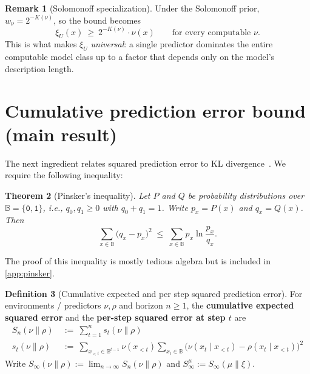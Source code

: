 \documentclass[fontsize=11pt, parskip=half]{scrartcl}
\newtheorem{theorem}{Theorem}[section]
\theoremstyle{definition}
\newtheorem{definition}[theorem]{Definition}
\newtheorem{remark}[theorem]{Remark}
\newcommand{\Sn}[2]{S_{n}(#1 \parallel #2)}
\begin{document}
\begin{remark}[Solomonoff specialization]
Under the Solomonoff prior, $w_\nu = 2^{-K(\nu)}$, so the bound becomes
\[
  \xi_U(x) ~\geq~ 2^{-K(\nu)} \cdot \nu(x) \qquad \text{for every computable }\nu.
\]
This is what makes $\xi_U$ \emph{universal}: a single predictor dominates the
entire computable model class up to a factor that depends only on the model's
description length.
\end{remark}

\section{Cumulative prediction error bound (main result)}\label{prob:bound}


The next ingredient relates squared prediction error to KL divergence~\cite[Lemma~11.6.1]{Cover:06}. 
We require the following inequality:

\begin{theorem}[Pinsker's inequality]\label{thm:pinsker}
Let $P$ and $Q$ be probability distributions over $\mathbb{B} = \{\texttt{0}, \texttt{1}\}$, i.e., $q_0, q_1 \geq 0$
with $q_0 + q_1 = 1$. Write $p_x = P(x)$ and $q_x = Q(x)$. Then
\[
    \sum_{x \in \mathbb{B}} \big( q_x - p_x \big)^2 \;\leq\; \sum_{x \in \mathbb{B}} p_x \ln \frac{p_x}{q_x}.
    \tag{$\star$}
\]

\end{theorem}
The proof of this inequality is mostly tedious algebra but is included in \cref{app:pinsker}. 


\begin{definition}[Cumulative expected and per step squared prediction error]\label{def:S_infty}
For environments / predictors $\nu, \rho$ and horizon $n \geq 1$, the \textbf{cumulative expected squared error} and the \textbf{per-step squared error at step $t$} are
\begin{align*}
\Sn{\nu}{\rho} ~&:=~ \sum_{t=1}^n s_t(\nu \parallel \rho) \\
s_t(\nu \parallel \rho) ~&:=~ \sum_{x_{<t} \in \mathbb{B}^{t-1}} \nu(x_{<t}) \sum_{x_t \in \mathbb{B}} \bigl(\nu(x_t \mid x_{<t}) - \rho(x_t \mid x_{<t})\bigr)^2
\end{align*}
Write $S_{\infty}(\nu \parallel \rho) := \lim_{n \to \infty} \Sn{\nu}{\rho}$
and $S_\infty^\mu := S_{\infty}(\mu \parallel \xi)$.
\end{definition}
\end{document}
